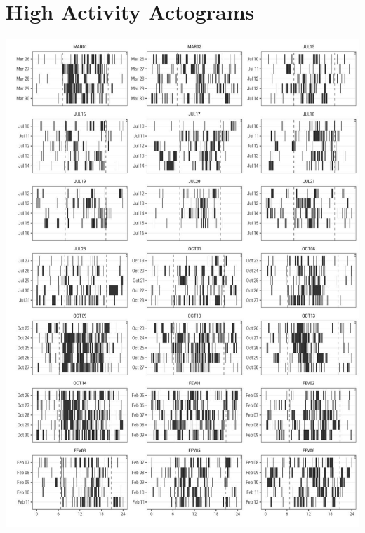 \documentclass[english,msc,numbers,hidelinks]{coppe}
\begin{document}
  \hypertarget{high-activity-actograms}{%
  \chapter{High Activity Actograms}\label{high-activity-actograms}}
  \begin{center}\includegraphics[width=0.95\linewidth]{../04_figures/actograms/actograms_high} \end{center}
\end{document}
